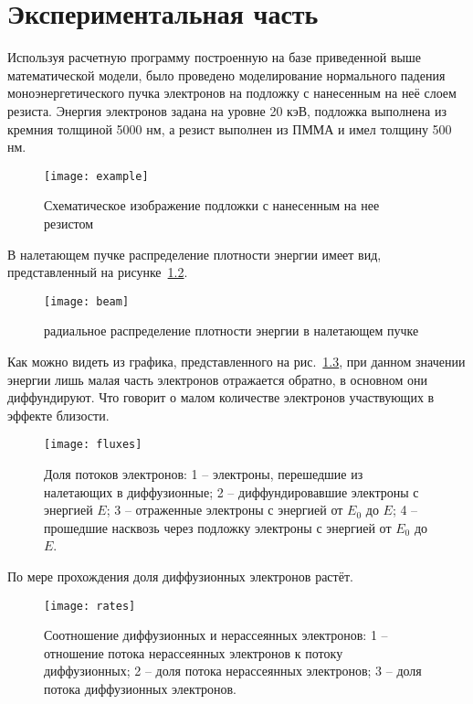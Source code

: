 \chapter{Экспериментальная часть}
Используя расчетную программу построенную на базе приведенной выше математической модели, было проведено моделирование нормального падения моноэнергетического пучка электронов на подложку с нанесенным на неё слоем резиста. Энергия электронов задана на уровне 20 кэВ, подложка выполнена из кремния толщиной 5000 нм, а резист выполнен из ПММА и имел толщину 500 нм.

\begin{figure}[h]
    \center
    \texttt{[image: example]}
    \caption{Схематическое изображение подложки с нанесенным на нее резистом}
    \label{fig:example}
\end{figure}

В налетающем пучке распределение плотности энергии имеет вид, представленный на рисунке~\ref{fig:beam}.
\begin{figure}[h]
    \center
    \texttt{[image: beam]}
    \caption{радиальное распределение плотности энергии в налетающем пучке}
    \label{fig:beam}
\end{figure}

Как можно видеть из графика, представленного на рис.~\ref{fig:fluxes}, при данном значении энергии лишь малая часть электронов отражается обратно, в основном они диффундируют. Что говорит о малом количестве электронов участвующих в эффекте близости.
\begin{figure}[h]
    \center
    \texttt{[image: fluxes]}
    \caption{Доля потоков электронов:
    1 -- электроны, перешедшие из налетающих в диффузионные;
2 -- диффундировавшие электроны с энергией $E$;
3 -- отраженные электроны с энергией от $E_0$ до $E$;
4 -- прошедшие насквозь через подложку электроны с энергией от $E_0$ до $E$.
}
    \label{fig:fluxes}
\end{figure}


По мере прохождения доля диффузионных электронов растёт.

\begin{figure}[h]
    \center
    \texttt{[image: rates]}
    \caption{Соотношение диффузионных и нерассеянных электронов: 1 -- отношение потока нерассеянных электронов к потоку диффузионных;
2 -- доля потока нерассеянных электронов;
3 -- доля потока диффузионных электронов.
}
    \label{fig:rates}
\end{figure}

